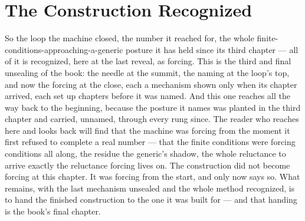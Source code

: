 \section{The Construction Recognized}

So the loop the machine closed, the number it reached for, the whole finite-conditions-approaching-a-generic
posture it has held since its third chapter --- all of it is recognized, here at the last reveal, as forcing. This
is the third and final unsealing of the book: the needle at the summit, the naming at the loop's top, and now the
forcing at the close, each a mechanism shown only when its chapter arrived, each set up chapters before it was
named. And this one reaches all the way back to the beginning, because the posture it names was planted in the
third chapter and carried, unnamed, through every rung since. The reader who reaches here and looks back will find
that the machine was forcing from the moment it first refused to complete a real number --- that the finite
conditions were forcing conditions all along, the residue the generic's shadow, the whole reluctance to arrive
exactly the reluctance forcing lives on. The construction did not become forcing at this chapter. It was forcing
from the start, and only now says so. What remains, with the last mechanism unsealed and the whole method
recognized, is to hand the finished construction to the one it was built for --- and that handing is the book's
final chapter.
